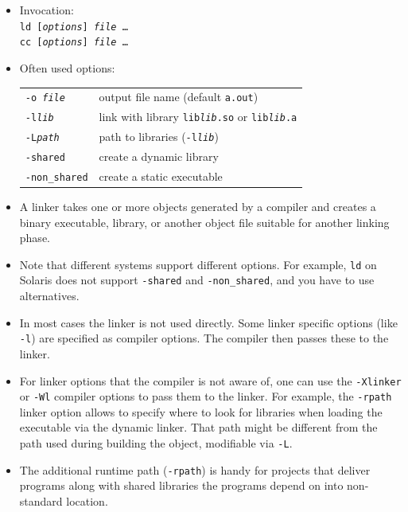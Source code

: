 \begin{slide}
\begin{itemize}
\item Invocation:\\
\texttt{ld [\emph{options}] \emph{file} \dots}\\
\texttt{cc [\emph{options}] \emph{file} \dots}
\item Often used options:\\
\begin{tabular}{ll}
\texttt{-o \emph{file}} & output file name (default \texttt{a.out})\\
\texttt{-l\emph{lib}} & link with library \texttt{lib\emph{lib}.so} or
\texttt{lib\emph{lib}.a}\\
\texttt{-L\emph{path}} & path to libraries (\texttt{-l\emph{lib}})\\
\texttt{-shared} & create a dynamic library\\
\texttt{-non\_shared} & create a static executable
\end{tabular}
\end{itemize}
\end{slide}

\begin{itemize}
\item A linker takes one or more objects generated by a compiler and creates a
binary executable, library, or another object file suitable for another linking
phase.
\item Note that different systems support different options.  For example,
\texttt{ld} on Solaris does not support \texttt{-shared} and
\texttt{-non\_shared}, and you have to use alternatives.
\item In most cases the linker is not used directly. Some linker specific
options (like \texttt{-l}) are specified as compiler options. The compiler then
passes these to the linker.
\item For linker options that the compiler is not aware of, one can use
the \texttt{-Xlinker} or \texttt{-Wl} compiler options to pass them to the
linker. For example, the \texttt{-rpath} linker option allows to specify where
to look for libraries when loading the executable via the dynamic linker.
That path might be different from the path used during building the object,
modifiable via \texttt{-L}.
\item The additional runtime path (\texttt{-rpath}) is handy for projects
that deliver programs along with shared libraries the programs depend on
into non-standard location.
\end{itemize}

